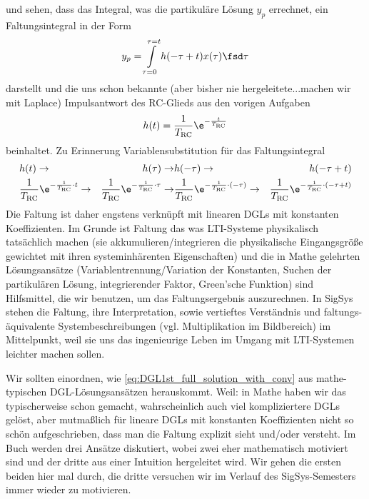 und sehen, dass das Integral, was die partikuläre Lösung $y_p$ errechnet, ein Faltungsintegral in der Form
\begin{align}
y_p = \int\limits_{\tau=0}^{\tau=t} h(-\tau+t) x(\tau) \fsd\tau
\end{align}
darstellt und die uns schon bekannte (aber bisher nie hergeleitete...machen wir mit Laplace) Impulsantwort des RC-Glieds aus den vorigen Aufgaben
\begin{align}
h(t) = \frac{1}{\TRC} \e^{-\frac{t}{\TRC}}
\end{align}
beinhaltet.
%
Zu Erinnerung Variablensubstitution für das Faltungsintegral
\begin{align}
&h(t)\rightarrow &h(\tau)\rightarrow &h(-\tau)\rightarrow &h(-\tau + t)\\
&\frac{1}{\TRC} \e^{-\frac{1}{\TRC} \cdot t}\rightarrow
&\frac{1}{\TRC} \e^{-\frac{1}{\TRC} \cdot \tau} \rightarrow
&\frac{1}{\TRC} \e^{-\frac{1}{\TRC} \cdot (-\tau)}\rightarrow
&\frac{1}{\TRC} \e^{-\frac{1}{\TRC} \cdot (-\tau+t)}
\end{align}
%
Die Faltung ist daher engstens verknüpft mit linearen DGLs mit konstanten Koeffizienten. Im Grunde ist Faltung das was LTI-Systeme physikalisch tatsächlich machen (sie akkumulieren/integrieren die physikalische Eingangsgröße gewichtet mit ihren systeminhärenten Eigenschaften) und die in Mathe gelehrten Lösungsansätze (Variablentrennung/Variation der Konstanten, Suchen der partikulären Lösung, integrierender Faktor, Green'sche Funktion) sind Hilfsmittel, die wir benutzen, um das Faltungsergebnis auszurechnen.
%
In SigSys stehen die Faltung, ihre Interpretation, sowie vertieftes Verständnis und faltungs-äquivalente Systembeschreibungen (vgl. Multiplikation im Bildbereich) im Mittelpunkt, weil sie uns das ingenieurige Leben im Umgang mit LTI-Systemen leichter machen sollen.

Wir sollten einordnen, wie \eqref{eq:DGL1st_full_solution_with_conv} aus mathe-typischen DGL-Lösungsansätzen herauskommt. Weil: in Mathe haben wir das typischerweise schon gemacht, wahrscheinlich auch viel kompliziertere DGLs gelöst, aber mutmaßlich für lineare DGLs mit konstanten Koeffizienten nicht so schön aufgeschrieben, dass man die Faltung explizit sieht und/oder versteht.
%
Im Buch \cite[Kap. 1.6]{Strang2014} werden drei Ansätze diskutiert, wobei zwei eher mathematisch motiviert sind und der dritte aus einer Intuition hergeleitet wird. Wir gehen die ersten beiden hier mal durch, die dritte versuchen wir im Verlauf des SigSys-Semesters immer wieder zu motivieren.

